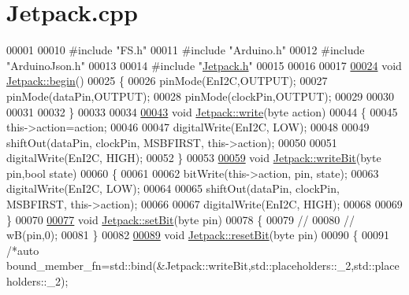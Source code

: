 \hypertarget{_jetpack_8cpp_source}{}\section{Jetpack.\+cpp}

\begin{DoxyCode}
00001 
00010 \textcolor{preprocessor}{#include "FS.h"}
00011 \textcolor{preprocessor}{#include "Arduino.h"}
00012 \textcolor{preprocessor}{#include "ArduinoJson.h"}
00013 
00014 \textcolor{preprocessor}{#include "\hyperlink{_jetpack_8h}{Jetpack.h}"}
00015 
00016 
00017 
\hyperlink{class_jetpack_a5a53e1ebf7aaf3bf3e0d37ea64ca09a7}{00024} \textcolor{keywordtype}{void} \hyperlink{class_jetpack_a5a53e1ebf7aaf3bf3e0d37ea64ca09a7}{Jetpack::begin}()
00025  \{ 
00026     pinMode(EnI2C,OUTPUT);
00027     pinMode(dataPin,OUTPUT);
00028     pinMode(clockPin,OUTPUT);
00029     
00030     
00031 
00032  \}
00033 
00034 
\hyperlink{class_jetpack_a338f1af8cbc6504ac69b47c7328569b5}{00043} \textcolor{keywordtype}{void} \hyperlink{class_jetpack_a338f1af8cbc6504ac69b47c7328569b5}{Jetpack::write}(byte action)
00044 \{
00045     this->action=action;
00046 
00047     digitalWrite(EnI2C, LOW);
00048     
00049     shiftOut(dataPin, clockPin, MSBFIRST, this->action);
00050 
00051     digitalWrite(EnI2C, HIGH);
00052 \}   
00053 
\hyperlink{class_jetpack_a79ae7bc3c1828a0551a7c005c4f8bd00}{00059} \textcolor{keywordtype}{void} \hyperlink{class_jetpack_a79ae7bc3c1828a0551a7c005c4f8bd00}{Jetpack::writeBit}(byte pin,\textcolor{keywordtype}{bool} state) 
00060 \{
00061 
00062     bitWrite(this->action, pin, state);
00063     digitalWrite(EnI2C, LOW);
00064     
00065     shiftOut(dataPin, clockPin, MSBFIRST, this->action);
00066 
00067     digitalWrite(EnI2C, HIGH);
00068 
00069 \}
00070 
\hyperlink{class_jetpack_a910c9023313d3896fd71a8a55dceeaa2}{00077} \textcolor{keywordtype}{void} \hyperlink{class_jetpack_a910c9023313d3896fd71a8a55dceeaa2}{Jetpack::setBit}(byte pin)
00078 \{
00079 \textcolor{comment}{//  }
00080 \textcolor{comment}{//  wB(pin,0);}
00081 \}   
00082 
\hyperlink{class_jetpack_ad1142aa8d4d8d0528566a5dc1fe85d54}{00089} \textcolor{keywordtype}{void} \hyperlink{class_jetpack_ad1142aa8d4d8d0528566a5dc1fe85d54}{Jetpack::resetBit}(byte pin)
00090 \{
00091     \textcolor{comment}{/*auto bound\_member\_fn=std::bind(&Jetpack::writeBit,std::placeholders::\_2,std::placeholders::\_2);}

\end{DoxyCode}
